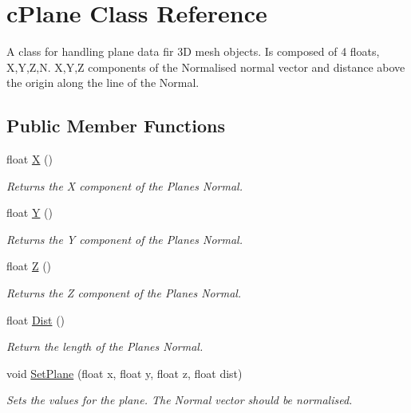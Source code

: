\hypertarget{classc_plane}{
\section{cPlane Class Reference}
\label{classc_plane}
}


A class for handling plane data fir 3D mesh objects. Is composed of 4 floats, X,Y,Z,N. X,Y,Z components of the Normalised normal vector and distance above the origin along the line of the Normal.  


\subsection*{Public Member Functions}
\begin{DoxyCompactItemize}
\item 
float \hyperlink{classc_plane_a0d4a4743e3c41a97e2b5362291acf7f1}{X} ()
\begin{DoxyCompactList}\small\item\em Returns the X component of the Planes Normal. \item\end{DoxyCompactList}\item 
float \hyperlink{classc_plane_a02c37b8c5e26034bf8112c0a67297449}{Y} ()
\begin{DoxyCompactList}\small\item\em Returns the Y component of the Planes Normal. \item\end{DoxyCompactList}\item 
float \hyperlink{classc_plane_a25cc6fd781fa6d55abe248221f0b78f8}{Z} ()
\begin{DoxyCompactList}\small\item\em Returns the Z component of the Planes Normal. \item\end{DoxyCompactList}\item 
float \hyperlink{classc_plane_a1135839bb472839f1ad4d3ed54b8d905}{Dist} ()
\begin{DoxyCompactList}\small\item\em Return the length of the Planes Normal. \item\end{DoxyCompactList}\item 
void \hyperlink{classc_plane_ae17fc24badba2a6d390be29d8184e5a8}{SetPlane} (float x, float y, float z, float dist)
\begin{DoxyCompactList}\small\item\em Sets the values for the plane. The Normal vector should be normalised. \item\end{DoxyCompactList}\item 

\end{DoxyCompactItemize}
